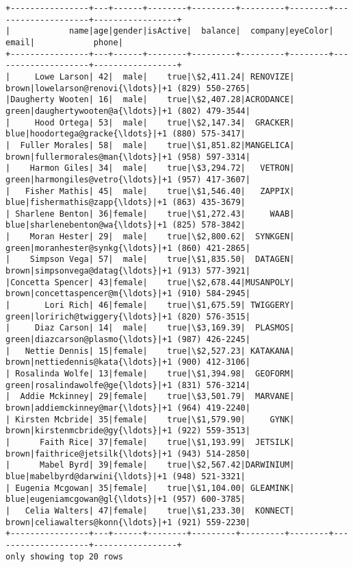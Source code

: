 \documentclass[11pt]{article}
\begin{document}
\begin{Verbatim}[commandchars=\\\{\}]
+----------------+---+------+--------+---------+---------+--------+--------------------+-----------------+
|            name|age|gender|isActive|  balance|  company|eyeColor|               email|            phone|
+----------------+---+------+--------+---------+---------+--------+--------------------+-----------------+
|     Lowe Larson| 42|  male|    true|\$2,411.24| RENOVIZE|   brown|lowelarson@renovi{\ldots}|+1 (829) 550-2765|
|Daugherty Wooten| 16|  male|    true|\$2,407.28|ACRODANCE|   green|daughertywooten@a{\ldots}|+1 (802) 479-3544|
|     Hood Ortega| 53|  male|    true|\$2,147.34|  GRACKER|    blue|hoodortega@gracke{\ldots}|+1 (880) 575-3417|
|  Fuller Morales| 58|  male|    true|\$1,851.82|MANGELICA|   brown|fullermorales@man{\ldots}|+1 (958) 597-3314|
|    Harmon Giles| 34|  male|    true|\$3,294.72|   VETRON|   green|harmongiles@vetro{\ldots}|+1 (957) 417-3607|
|   Fisher Mathis| 45|  male|    true|\$1,546.40|   ZAPPIX|    blue|fishermathis@zapp{\ldots}|+1 (863) 435-3679|
| Sharlene Benton| 36|female|    true|\$1,272.43|     WAAB|    blue|sharlenebenton@wa{\ldots}|+1 (825) 578-3842|
|    Moran Hester| 29|  male|    true|\$2,800.62|  SYNKGEN|   green|moranhester@synkg{\ldots}|+1 (860) 421-2865|
|    Simpson Vega| 57|  male|    true|\$1,835.50|  DATAGEN|   brown|simpsonvega@datag{\ldots}|+1 (913) 577-3921|
|Concetta Spencer| 43|female|    true|\$2,678.44|MUSANPOLY|   brown|concettaspencer@m{\ldots}|+1 (910) 584-2945|
|       Lori Rich| 46|female|    true|\$1,675.59| TWIGGERY|   green|loririch@twiggery{\ldots}|+1 (820) 576-3515|
|     Diaz Carson| 14|  male|    true|\$3,169.39|  PLASMOS|   green|diazcarson@plasmo{\ldots}|+1 (987) 426-2245|
|   Nettie Dennis| 15|female|    true|\$2,527.23| KATAKANA|   brown|nettiedennis@kata{\ldots}|+1 (900) 412-3106|
| Rosalinda Wolfe| 13|female|    true|\$1,394.98|  GEOFORM|   green|rosalindawolfe@ge{\ldots}|+1 (831) 576-3214|
|  Addie Mckinney| 29|female|    true|\$3,501.79|  MARVANE|   brown|addiemckinney@mar{\ldots}|+1 (964) 419-2240|
| Kirsten Mcbride| 35|female|    true|\$1,579.90|     GYNK|   brown|kirstenmcbride@gy{\ldots}|+1 (922) 559-3513|
|      Faith Rice| 37|female|    true|\$1,193.99|  JETSILK|   brown|faithrice@jetsilk{\ldots}|+1 (943) 514-2850|
|      Mabel Byrd| 39|female|    true|\$2,567.42|DARWINIUM|    blue|mabelbyrd@darwini{\ldots}|+1 (948) 521-3321|
| Eugenia Mcgowan| 35|female|    true|\$1,104.00| GLEAMINK|    blue|eugeniamcgowan@gl{\ldots}|+1 (957) 600-3785|
|   Celia Walters| 47|female|    true|\$1,233.30|  KONNECT|   brown|celiawalters@konn{\ldots}|+1 (921) 559-2230|
+----------------+---+------+--------+---------+---------+--------+--------------------+-----------------+
only showing top 20 rows


    \end{Verbatim}
\end{document}

